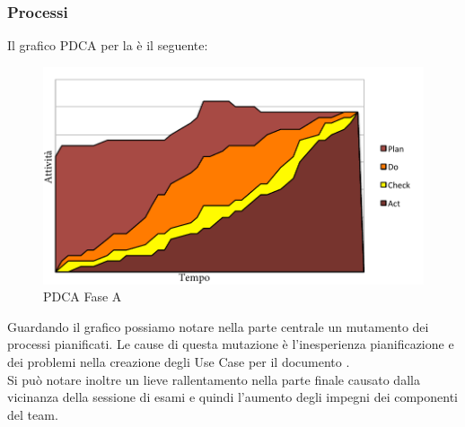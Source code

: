 					\subsubsection{Processi}
						Il grafico PDCA per la  è il seguente:
						\begin{figure}[H]\centering
							\includegraphics[width=\textwidth]{PianoDiQualifica/Pics/PDCAFaseA.pdf}
							\caption{PDCA Fase A}
						\end{figure}
						Guardando il grafico possiamo notare nella parte centrale un mutamento dei processi pianificati. Le cause di questa mutazione è l'inesperienza pianificazione e dei problemi nella creazione degli Use Case per il documento .\\
						Si può notare inoltre un lieve rallentamento nella parte finale causato dalla vicinanza della sessione di esami e quindi l'aumento degli impegni dei componenti del team.\\ \\
						
						